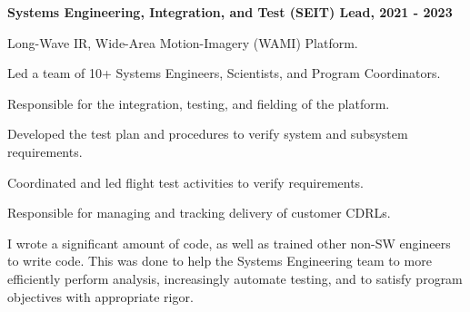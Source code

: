 \documentclass[10pt]{article}
\newenvironment{outerlist}[1][\enskip\textbullet]%
        {\begin{itemize}[#1]}{\end{itemize}%
         \vspace{-.6\baselineskip}}
\newenvironment{innerlist}[1][\enskip\textbullet]%
        {\begin{compactitem}[#1]}{\end{compactitem}}
\begin{document}
     \begin{outerlist}
         \item \textbf{Systems Engineering, Integration, and Test (SEIT) Lead, 2021 - 2023}\\
         \begin{innerlist}
            \item Long-Wave IR, Wide-Area Motion-Imagery (WAMI) Platform.
            \item Led a team of 10+ Systems Engineers, Scientists, and Program Coordinators.
            \item Responsible for the integration, testing, and fielding of the platform.
            \begin{innerlist}
                \item Developed the test plan and procedures to verify system and subsystem requirements. 
                \item Coordinated and led flight test activities to verify requirements.
                \item Responsible for managing and tracking delivery of customer CDRLs.
            \end{innerlist}
            \item I wrote a significant amount of code, as well as trained other non-SW engineers to write code.  This was done to help the Systems Engineering 
                  team to more efficiently perform analysis, increasingly automate testing, and to satisfy program objectives with appropriate rigor.\\
         \end{innerlist}
         

\end{outerlist}
\end{document}
